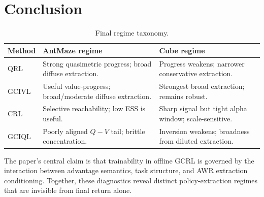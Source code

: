 \documentclass[11pt]{article}
\begin{document}
\section{Conclusion}

\begin{table}[t!]
\centering
\small
\begin{tabularx}{\textwidth}{lXX}
\toprule
Method & AntMaze regime & Cube regime \\
\midrule
QRL & Strong quasimetric progress; broad diffuse extraction. & Progress weakens; narrower conservative extraction. \\
GCIVL & Useful value-progress; broad/moderate diffuse extraction. & Strongest broad extraction; remains robust. \\
CRL & Selective reachability; low ESS is useful. & Sharp signal but tight alpha window; scale-sensitive. \\
GCIQL & Poorly aligned $Q-V$ tail; brittle concentration. & Inversion weakens; broadness from diluted extraction. \\
\bottomrule
\end{tabularx}
\caption{Final regime taxonomy.}
\end{table}

The paper's central claim is that trainability in offline GCRL is governed by the interaction between advantage semantics, task structure, and AWR extraction conditioning. Together, these diagnostics reveal distinct policy-extraction regimes that are invisible from final return alone.
\end{document}
